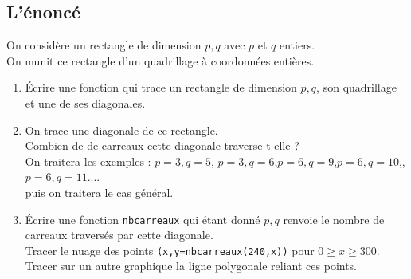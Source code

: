 \documentclass[a4paper,11pt]{book}
\begin{document}
\subsection{L'\'enonc\'e}
On consid\`ere un rectangle de dimension $p,q$ avec $p$ et $q$ entiers.\\
On munit ce rectangle d'un quadrillage \`a coordonn\'ees enti\`eres.\\
\begin{enumerate}
\item \'Ecrire une fonction qui trace un rectangle de dimension $p,q$, son
quadrillage et une de ses diagonales.
\item On trace une diagonale de ce rectangle.\\
Combien de  de carreaux cette diagonale traverse-t-elle ?\\
On traitera les exemples :
$p=3,q=5$, $p=3,q=6$,$p=6,q=9$,$p=6,q=10$,,$p=6,q=11$....\\
puis on traitera le cas g\'en\'eral.\\
\item \'Ecrire une fonction {\tt nbcarreaux} qui \'etant donn\'e $p,q$ renvoie 
le nombre de carreaux travers\'es par  cette diagonale.\\
Tracer le nuage des points {\tt (x,y=nbcarreaux(240,x))} pour 
$0\geq x \geq 300$. Tracer sur un autre graphique 
la ligne polygonale reliant ces points.
\end{enumerate}
\end{document}
